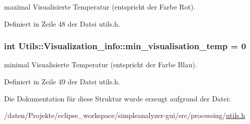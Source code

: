 maximal Visualisierte Temperatur (entspricht der Farbe Rot). 



Definiert in Zeile 48 der Datei utils.\-h.

\hypertarget{structUtils_1_1Visualization__info_a6e192352d1f00709f8ef963206ff2653}{
\subsubsection[{min\-\_\-visualisation\-\_\-temp}]{\setlength{\rightskip}{0pt plus 5cm}int Utils\-::\-Visualization\-\_\-info\-::min\-\_\-visualisation\-\_\-temp = 0}}\label{structUtils_1_1Visualization__info_a6e192352d1f00709f8ef963206ff2653}


minimal Visualisierte Temperatur (entspricht der Farbe Blau). 



Definiert in Zeile 49 der Datei utils.\-h.



Die Dokumentation für diese Struktur wurde erzeugt aufgrund der Datei\-:\begin{DoxyCompactItemize}
\item 
/daten/\-Projekte/eclipse\-\_\-workspace/simpleanalyzer-\/gui/src/processing/\hyperlink{simpleanalyzer-gui_2src_2processing_2utils_8h}{utils.\-h}\end{DoxyCompactItemize}
